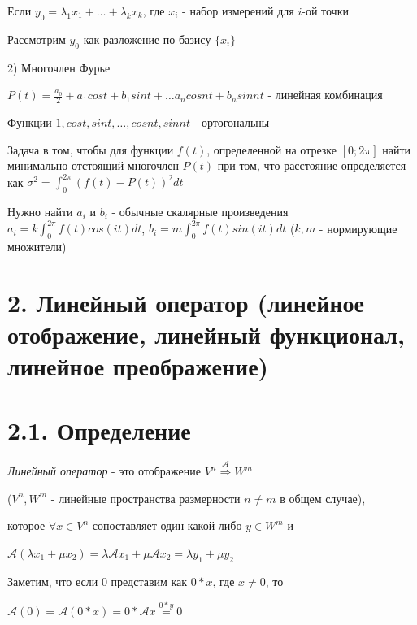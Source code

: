 \documentclass[12pt]{article}
\begin{document}
    Если $\displaystyle y_0 = \lambda_1 x_1 + \dots + \lambda_k x_k$, где $\displaystyle x_i$ - набор измерений для $i$-ой точки

    Рассмотрим $\displaystyle y_0$ как разложение по базису $\displaystyle \{x_i\}$

    \vspace{5mm}

    2) Многочлен Фурье

    $\displaystyle P(t) = \frac{a_0}{2} + a_1 cos t + b_1 sin t + \dots a_n cos nt + b_n sin nt$ - линейная комбинация

    Функции ${1, cos t, sin t, \dots, cos nt, sin nt}$ - ортогональны

    Задача в том, чтобы для функции $f(t)$, определенной на отрезке $[0;2\pi]$ найти минимально отстоящий многочлен $P(t)$ при том,
    что расстояние определяется как $\displaystyle \sigma^2 = \int_0^{2\pi} (f(t) - P(t))^2 dt$

    Нужно найти $\displaystyle a_i$ и $\displaystyle b_i$ - обычные скалярные произведения $\displaystyle a_i = k \int_0^{2\pi} f(t) cos(it) dt$, $\displaystyle b_i = m \int_0^{2\pi} f(t) sin(it) dt$ ($k, m$ - нормирующие множители)

    \clearpage

    \section{2. Линейный оператор (линейное отображение, линейный функционал, линейное преображение)}

    \section{2.1. Определение}

    \textit{Линейный оператор} - это отображение $\displaystyle V^n \stackrel{\mathcal{A}}{\Longrightarrow} W^m$

    ($\displaystyle V^n, W^m$ - линейные пространства размерности $n \neq m$ в общем случае),

    которое $\displaystyle \forall x \in V^n$ сопоставляет один какой-либо $\displaystyle y \in W^m$ и

    $\displaystyle \mathcal{A} (\lambda x_1 + \mu x_2) = \lambda \mathcal{A} x_1 + \mu \mathcal{A} x_2 = \lambda y_1 + \mu y_2$

    \Nota Заметим, что если 0 представим как $0 * x$, где $x \neq 0$, то

    $\mathcal{A}(0) = \mathcal{A}(0 * x) = 0 * \mathcal{A}x \stackrel{0 * y}{=} 0$
\end{document}
